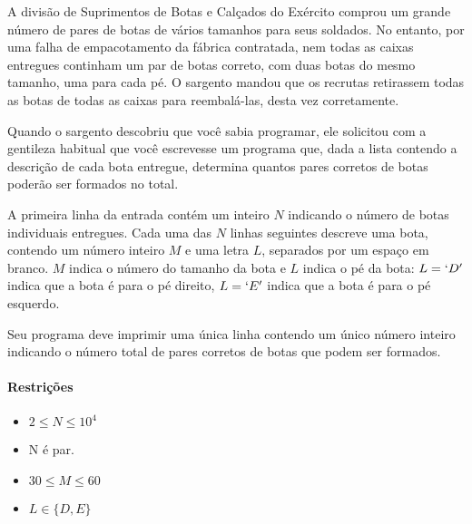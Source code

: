 %
%
%
%

A divisão de Suprimentos de Botas e Calçados do Exército comprou um grande número de pares de botas de vários tamanhos para seus soldados. No entanto, por uma falha de empacotamento da fábrica contratada, nem todas as caixas entregues continham um par de botas correto, com duas botas do mesmo tamanho, uma para cada pé. O sargento mandou que os recrutas retirassem todas as botas de todas as caixas para reembalá-las, desta vez corretamente.

Quando o sargento descobriu que você sabia programar, ele solicitou com a gentileza habitual que você escrevesse um programa que, dada a lista contendo a descrição de cada bota entregue, determina quantos pares corretos de botas poderão ser formados no total.

\Entrada%
A primeira linha da entrada contém um inteiro $N$ indicando o número de botas individuais entregues. Cada uma das $N$ linhas seguintes descreve uma bota, contendo um número inteiro $M$ e uma letra $L$, separados por um espaço em branco. $M$ indica o número do tamanho da bota e $L$ indica o pé da bota: $L = `D'$ indica que a bota é para o pé direito, $L = `E'$ indica que a bota é para o pé esquerdo.

\Saida%
Seu programa deve imprimir uma única linha contendo um único número inteiro indicando o número total de pares corretos de botas que podem ser formados.

\paragraph{Restrições}%
\begin{itemize}
	\item $2 \leq N \leq 10^4$
	\item N é par.
	\item $30 \leq M \leq 60$
	\item $L \in \{D, E\}$
\end{itemize}

%
